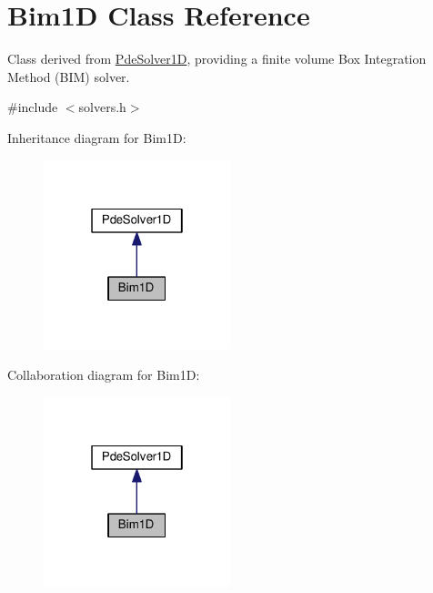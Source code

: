 \hypertarget{classBim1D}{\section{Bim1\-D Class Reference}
\label{classBim1D}
}


Class derived from \hyperlink{classPdeSolver1D}{Pde\-Solver1\-D}, providing a finite volume Box Integration Method (B\-I\-M) solver.  




{\ttfamily \#include $<$solvers.\-h$>$}



Inheritance diagram for Bim1\-D\-:\nopagebreak
\begin{figure}[H]
\begin{center}
\leavevmode
\includegraphics[width=154pt]{classBim1D__inherit__graph}
\end{center}
\end{figure}


Collaboration diagram for Bim1\-D\-:\nopagebreak
\begin{figure}[H]
\begin{center}
\leavevmode
\includegraphics[width=154pt]{classBim1D__coll__graph}
\end{center}
\end{figure}
